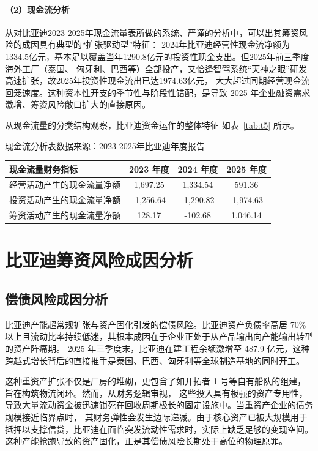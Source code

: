 \documentclass[12pt,a4paper,fontset=windows,UTF8]{ctexart}
\begin{document}
\paragraph*{（2）现金流分析}

从对比亚迪2023-2025年现金流量表所做的系统、严谨的分析中，可以出其筹资风险的成因具有典型的“扩张驱动型”特征：
  2024年比亚迪经营性现金流净额为1334.5亿元，基本足以覆盖当年1290.8亿元的投资性现金支出。但2025年前三季度海外工厂（泰国、
  匈牙利、巴西等）全部投产，又恰逢智驾系统“天神之眼”研发高速扩张，故2025年投资性现金流出已达1974.63亿元，
  大大超过同期经营现金流回笼速度。这种资本性开支的季节性与阶段性错配，是导致 2025 年企业融资需求激增、筹资风险敞口扩大的直接原因。

从现金流量的分类结构观察，比亚迪资金运作的整体特征 如表~\ref{tab:t5} 所示。

\begin{thesTab}[htbp]{现金流分析表\label{tab:t5}}{数据来源：2023-2025年比亚迪年度报告}
\begin{tabularx}{0.86\linewidth}{X c c c}
  \toprule
  现金流量财务指标 & 2023 年度 & 2024 年度 & 2025 年度 \\
  \midrule
  经营活动产生的现金流量净额 & 1,697.25 & 1,334.54 & 591.36 \\
  投资活动产生的现金流量净额 & -1,256.64 & -1,290.82 & -1,974.63 \\
  筹资活动产生的现金流量净额 & 128.17 & -102.68 & 1,046.14 \\
  \bottomrule
\end{tabularx}
\end{thesTab}

\section{比亚迪筹资风险成因分析}

\subsection{偿债风险成因分析}

比亚迪产能超常规扩张与资产固化引发的偿债风险。比亚迪资产负债率高居 70\% 以上且流动比率持续低迷，其根本成因在于企业正处于从产品输出向产能输出转型的资产阵痛期。
  2025 年三季度末，比亚迪在建工程余额激增至 487.9 亿元，这种跨越式增长背后的直接推手是泰国、巴西、匈牙利等全球制造基地的同时开工。

这种重资产扩张不仅是厂房的堆砌，更包含了如开拓者 1 号等自有船队的组建，旨在构筑物流闭环。然而，从财务逻辑审视，
  这些投入具有极强的资产专用性，导致大量流动资金被迅速锁死在回收周期极长的固定设施中。当重资产企业的债务规模接近临界点时，
  其财务弹性会发生边际递减。由于核心资产已被大规模用于抵押以支撑信贷，比亚迪在面临突发流动性需求时，实际上缺乏足够的变现空间。
  这种产能抢跑导致的资产固化，正是其偿债风险长期处于高位的物理原罪。
\end{document}
